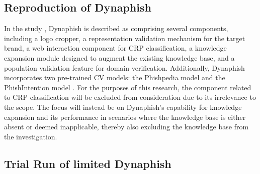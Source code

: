 \subsection{Reproduction of Dynaphish}


In the study \cite{liu2023knowledge}, Dynaphish is described as comprising several components, including a logo cropper, a representation validation mechanism for the target brand, a web interaction component for CRP classification, a knowledge expansion module designed to augment the existing knowledge base, and a population validation feature for domain verification. Additionally, Dynaphish incorporates two pre-trained CV models: the Phishpedia model \cite{lin2021phishpedia} and the PhishIntention model \cite{lin2021phishpedia}. For the purposes of this research, the component related to CRP classification will be excluded from consideration due to its irrelevance to the scope. The focus will instead be on Dynaphish's capability for knowledge expansion and its performance in scenarios where the knowledge base is either absent or deemed inapplicable, thereby also excluding the knowledge base from the investigation.

\subsection{Trial Run of limited Dynaphish}


